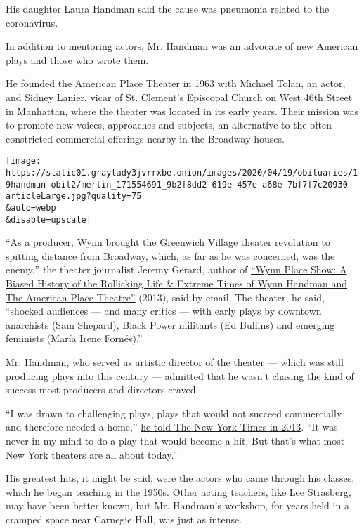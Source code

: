 His daughter Laura Handman said the cause was pneumonia related to the
coronavirus.

In addition to mentoring actors, Mr. Handman was an advocate of new
American plays and those who wrote them.

He founded the American Place Theater in 1963 with Michael Tolan, an
actor, and Sidney Lanier, vicar of St. Clement's Episcopal Church on
West 46th Street in Manhattan, where the theater was located in its
early years. Their mission was to promote new voices, approaches and
subjects, an alternative to the often constricted commercial offerings
nearby in the Broadway houses.

\texttt{[image: https://static01.graylady3jvrrxbe.onion/images/2020/04/19/obituaries/19handman-obit2/merlin\_171554691\_9b2f8dd2-619e-457e-a68e-7bf7f7c20930-articleLarge.jpg?quality=75\\\&auto=webp\\\&disable=upscale]}

``As a producer, Wynn brought the Greenwich Village theater revolution
to spitting distance from Broadway, which, as far as he was concerned,
was the enemy,'' the theater journalist Jeremy Gerard, author of
\href{https://www.americantheatre.org/2014/06/14/wynn-place-show-honors-the-career-of-producer-wynn-handman-2/}{``Wynn
Place Show: A Biased History of the Rollicking Life \& Extreme Times of
Wynn Handman and The American Place Theatre''} (2013), said by email.
The theater, he said, ``shocked audiences --- and many critics --- with
early plays by downtown anarchists (Sam Shepard), Black Power militants
(Ed Bullins) and emerging feminists (María Irene Fornés).''

Mr. Handman, who served as artistic director of the theater --- which
was still producing plays into this century --- admitted that he wasn't
chasing the kind of success most producers and directors craved.

``I was drawn to challenging plays, plays that would not succeed
commercially and therefore needed a home,''
\href{https://www.nytimes3xbfgragh.onion/2013/12/26/arts/former-students-and-wynn-place-show-praise-wynn-handman.html}{he
told The New York Times in 2013}. ``It was never in my mind to do a play
that would become a hit. But that's what most New York theaters are all
about today.''

His greatest hits, it might be said, were the actors who came through
his classes, which he began teaching in the 1950s. Other acting
teachers, like Lee Strasberg, may have been better known, but Mr.
Handman's workshop, for years held in a cramped space near Carnegie
Hall, was just as intense.

